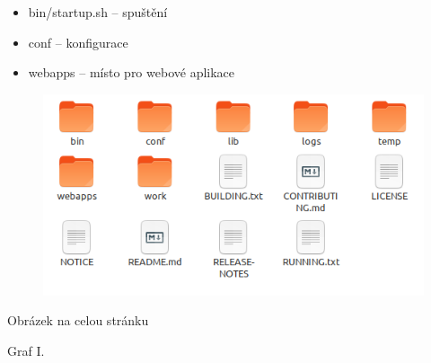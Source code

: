 \documentclass{beamer}							%
\begin{document}
\begin{frame}{}
	\begin{itemize}
		\item bin/startup.sh -- spuštění
		\item conf -- konfigurace
		\item webapps -- místo pro webové aplikace
	\end{itemize}

	\begin{figure}[htp]
		\includegraphics[width=\linewidth]{images/tomcat-webapps.png}
	\end{figure}
\end{frame}
\begin{frame}{Obrázek na celou stránku}
\end{frame}
\begin{frame}{Graf I.}
\begin{center}
\end{center}
\end{frame}
\end{document}
